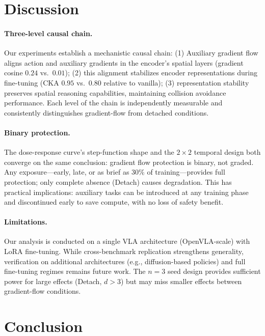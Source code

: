 \documentclass[letterpaper]{article}
\begin{document}
\section{Discussion}
\label{sec:discussion}

\paragraph{Three-level causal chain.}
Our experiments establish a mechanistic causal chain: (1) Auxiliary gradient flow aligns action and auxiliary gradients in the encoder's spatial layers (gradient cosine $0.24$ vs.\ $0.01$); (2) this alignment stabilizes encoder representations during fine-tuning (CKA $0.95$ vs.\ $0.80$ relative to vanilla); (3) representation stability preserves spatial reasoning capabilities, maintaining collision avoidance performance. Each level of the chain is independently measurable and consistently distinguishes gradient-flow from detached conditions.

\paragraph{Binary protection.}
The dose-response curve's step-function shape and the $2 \times 2$ temporal design both converge on the same conclusion: gradient flow protection is binary, not graded. Any exposure---early, late, or as brief as 30\% of training---provides full protection; only complete absence (Detach) causes degradation. This has practical implications: auxiliary tasks can be introduced at any training phase and discontinued early to save compute, with no loss of safety benefit.

\paragraph{Limitations.}
Our analysis is conducted on a single VLA architecture (OpenVLA-scale) with LoRA fine-tuning. While cross-benchmark replication strengthens generality, verification on additional architectures (e.g., diffusion-based policies) and full fine-tuning regimes remains future work. The $n$$=$$3$ seed design provides sufficient power for large effects (Detach, $d > 3$) but may miss smaller effects between gradient-flow conditions.

\section{Conclusion}
\label{sec:conclusion}
\end{document}

